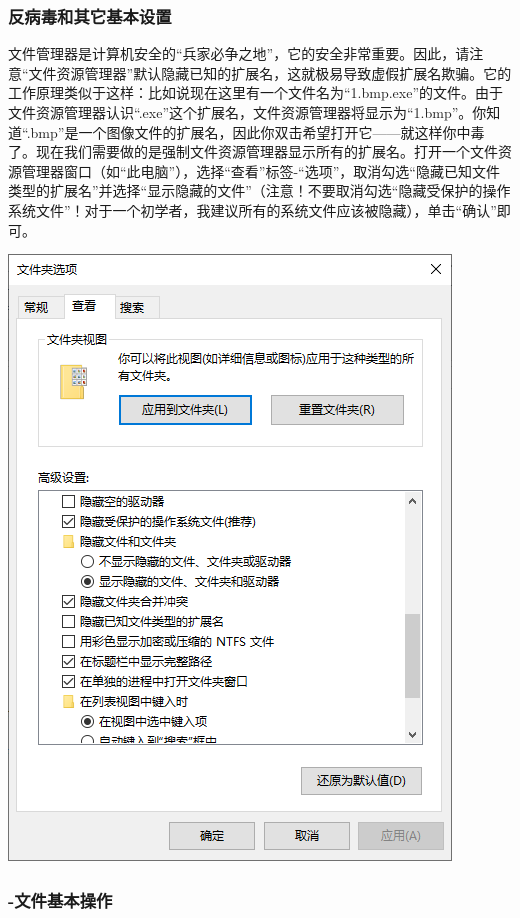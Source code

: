 \subsubsection{反病毒和其它基本设置}
文件管理器是计算机安全的“兵家必争之地”，它的安全非常重要。因此，请注意“文件资源管理器”默认隐藏已知的扩展名，这就极易导致虚假扩展名欺骗。它的工作原理类似于这样：比如说现在这里有一个文件名为“1.bmp.exe”的文件。由于文件资源管理器认识“.exe”这个扩展名，文件资源管理器将显示为“1.bmp”。你知道“.bmp”是一个图像文件的扩展名，因此你双击希望打开它——就这样你中毒了。现在我们需要做的是强制文件资源管理器显示所有的扩展名。打开一个文件资源管理器窗口（如“此电脑”），选择“查看”标签-“选项”，取消勾选“隐藏已知文件类型的扩展名”并选择“显示隐藏的文件”（注意！不要取消勾选“隐藏受保护的操作系统文件”！对于一个初学者，我建议所有的系统文件应该被隐藏），单击“确认”即可。
\begin{center}
	\includegraphics[scale=0.8]{pic/expset}
\end{center} \par
\subsubsection{-文件基本操作}

